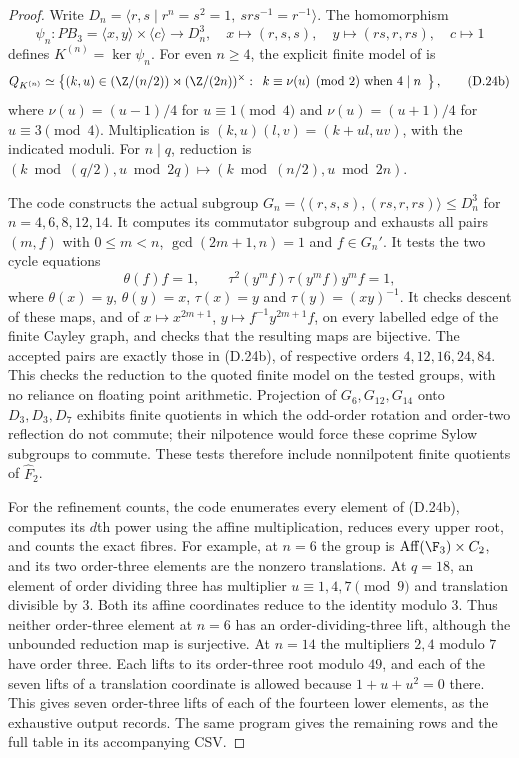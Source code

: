 \begin{proof}
Write $D_n=\langle r,s\mid r^n=s^2=1,\ srs^{-1}=r^{-1}\rangle$.
The homomorphism
\[
 \psi_n:PB_3=\langle x,y\rangle\times\langle c\rangle
       \longrightarrow D_n^3,
 \quad x\longmapsto(r,s,s),\quad
 y\longmapsto(rs,r,rs),\quad c\longmapsto1
\]
defines $K^{(n)}=\ker\psi_n$. For even $n\geq4$, the explicit
finite model of \cite[Theorem 4.3 and Proposition 4.5]{A-BDHPShadows}
is
\[
 Q_{K^{(n)}}\simeq
 \left\{(k,u)\in(\Z/(n/2))\rtimes(\Z/(2n))^\times:
 \begin{array}{l}
 k\equiv\nu(u)\pmod2\text{ when }4\mid n
 \end{array}\right\},                                  \tag{D.24b}
\]
where $\nu(u)=(u-1)/4$ for $u\equiv1\pmod4$ and
$\nu(u)=(u+1)/4$ for $u\equiv3\pmod4$.
Multiplication is $(k,u)(l,v)=(k+ul,uv)$, with the indicated
moduli. For $n\mid q$, reduction is
$(k\bmod(q/2),u\bmod2q)\mapsto(k\bmod(n/2),u\bmod2n)$.

The code constructs the actual subgroup
$G_n=\langle(r,s,s),(rs,r,rs)\rangle\leq D_n^3$ for
$n=4,6,8,12,14$. It computes its commutator subgroup and exhausts
all pairs $(m,f)$ with $0\leq m<n$, $\gcd(2m+1,n)=1$ and
$f\in G_n'$. It tests the two cycle equations
\[
 \theta(f)f=1,\qquad
 \tau^2(y^mf)\tau(y^mf)y^mf=1,
\]
where $\theta(x)=y$, $\theta(y)=x$, $\tau(x)=y$ and
$\tau(y)=(xy)^{-1}$. It checks descent of these maps, and of
$x\mapsto x^{2m+1}$, $y\mapsto f^{-1}y^{2m+1}f$, on every
labelled edge of the finite Cayley graph, and checks that the
resulting maps are bijective. The accepted pairs are exactly
those in (D.24b), of respective orders $4,12,16,24,84$.
This checks the reduction to the quoted finite model on the
tested groups, with no reliance on floating point arithmetic.
Projection of $G_6,G_{12},G_{14}$ onto $D_3,D_3,D_7$
exhibits finite quotients in which the odd-order rotation and
order-two reflection do not commute; their nilpotence would
force these coprime Sylow subgroups to commute. These tests
therefore include nonnilpotent finite quotients of $\widehat F_2$.

For the refinement counts, the code enumerates every element of
(D.24b), computes its $d$th power using the affine multiplication,
reduces every upper root, and counts the exact fibres. For example,
at $n=6$ the group is
$\operatorname{Aff}(\F_3)\times C_2$, and its two order-three
elements are the nonzero translations. At $q=18$, an element of
order dividing three has multiplier $u\equiv1,4,7\pmod9$ and
translation divisible by $3$. Both its affine coordinates reduce
to the identity modulo $3$. Thus neither order-three element
at $n=6$ has an order-dividing-three lift, although the unbounded
reduction map is surjective. At $n=14$ the multipliers $2,4$
modulo $7$ have order three. Each lifts to its order-three
root modulo $49$, and each of the seven lifts of a translation
coordinate is allowed because $1+u+u^2=0$ there. This gives
seven order-three lifts of each of the fourteen lower elements,
as the exhaustive output records. The same program gives the
remaining rows and the full table in its accompanying CSV.


\end{proof}

